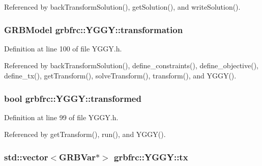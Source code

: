Referenced by back\+Transform\+Solution(), get\+Solution(), and write\+Solution().

\subsubsection[{\texorpdfstring{transformation}{transformation}}]{\setlength{\rightskip}{0pt plus 5cm}G\+R\+B\+Model grbfrc\+::\+Y\+G\+G\+Y\+::transformation\hspace{0.3cm}{\ttfamily [private]}}\hypertarget{classgrbfrc_1_1YGGY_a6f528d327b9dfbe474d357afe8a3d518}{}\label{classgrbfrc_1_1YGGY_a6f528d327b9dfbe474d357afe8a3d518}


Definition at line 100 of file Y\+G\+G\+Y.\+h.



Referenced by back\+Transform\+Solution(), define\+\_\+constraints(), define\+\_\+objective(), define\+\_\+tx(), get\+Transform(), solve\+Transform(), transform(), and Y\+G\+G\+Y().

\subsubsection[{\texorpdfstring{transformed}{transformed}}]{\setlength{\rightskip}{0pt plus 5cm}bool grbfrc\+::\+Y\+G\+G\+Y\+::transformed\hspace{0.3cm}{\ttfamily [private]}}\hypertarget{classgrbfrc_1_1YGGY_a5eed2fc478b6fd379458bb2a1bcf0e14}{}\label{classgrbfrc_1_1YGGY_a5eed2fc478b6fd379458bb2a1bcf0e14}


Definition at line 99 of file Y\+G\+G\+Y.\+h.



Referenced by get\+Transform(), run(), and Y\+G\+G\+Y().

\subsubsection[{\texorpdfstring{tx}{tx}}]{\setlength{\rightskip}{0pt plus 5cm}std\+::vector$<$G\+R\+B\+Var$\ast$$>$ grbfrc\+::\+Y\+G\+G\+Y\+::tx\hspace{0.3cm}{\ttfamily [private]}}\hypertarget{classgrbfrc_1_1YGGY_a1c58fb733dc53d1bf8823623aaf297f8}{}\label{classgrbfrc_1_1YGGY_a1c58fb733dc53d1bf8823623aaf297f8}


